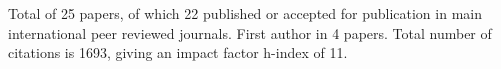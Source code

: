 Total of 25 papers, of which 22 published or accepted for publication in main international peer reviewed journals. First author in 4 papers.
\noindent Total number of citations is 1693, giving an impact factor h-index of 11.

